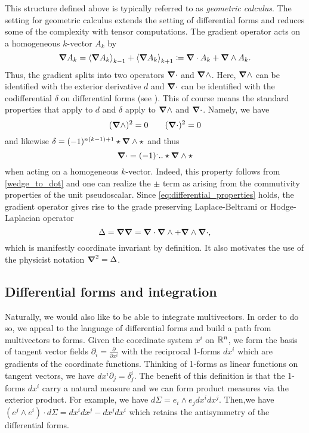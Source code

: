 This structure defined above is typically referred to as \emph{geometric calculus}.  The setting for geometric calculus extends the setting of differential forms and reduces some of the complexity with tensor computations.  The gradient operator acts on a homogeneous $k$-vector $A_k$ by
\[
\grad A_k = \proj{k-1}{\grad A_k} + \proj{k+1}{\grad A_k} \coloneqq \grad \cdot A_k + \grad \wedge A_k.
\]
Thus, the gradient splits into two operators $\grad \cdot$ and $\grad \wedge$.  Here, $\grad \wedge$ can be identified with the exterior derivative $d$ and $\grad \cdot$ can be identified with the codifferential $\delta$ on differential forms (see \cite{schindler_geometric_2020}). This of course means the standard properties that apply to $d$ and $\delta$ apply to $\grad \wedge$ and $\grad \cdot$. Namely, we have
\begin{equation}
\label{eq:differential_properties}
(\grad \wedge)^2=0 \qquad (\grad \cdot)^2 = 0 
\end{equation}
and likewise $\delta = (-1)^{n(k-1)+1}\star \grad \wedge \star$ and thus 
\begin{equation}
\grad \cdot = (-1)^... \star \grad \wedge \star 
\end{equation}
when acting on a homogeneous $k$-vector. Indeed, this property follows from \ref{wedge_to_dot} and one can realize the $\pm$ term as arising from the commutivity properties of the unit pseudoscalar. Since \ref{eq:differential_properties} holds, the gradient operator gives rise to the grade preserving Laplace-Beltrami or Hodge-Laplacian operator
\[
\Delta = \grad \grad = \grad \cdot \grad \wedge + \grad \wedge \grad \cdot,
\]
which is manifestly coordinate invariant by definition.  It also motivates the use of the physicist notation $\grad^2=\Delta$.

\subsection{Differential forms and integration}

Naturally, we would also like to be able to integrate multivectors.  In order to do so, we appeal to the language of differential forms and build a path from multivectors to forms. Given the coordinate system $x^i$ on $\R^n$, we form the basis of tangent vector fields $\partial_i = \frac{\partial}{\partial x^i}$ with the reciprocal 1-forms $dx^i$ which are gradients of the coordinate functions.  Thinking of 1-forms as linear functions on tangent vectors, we have $dx^i  \partial_j = \delta^i_j$.  The benefit of this definition is that the 1-forms $dx^i$ carry a natural measure and we can form product measures via the exterior product.  For example, we have $d\Sigma = e_i \wedge e_j dx^i dx^j$.  Then,we have $(e^j \wedge e^i)\cdot d\Sigma = dx^idx^j - dx^j dx^i$ which retains the antisymmetry of the differential forms. 

